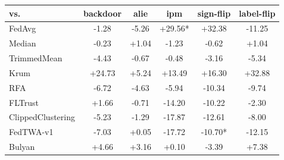 \begin{tabular}{lccccc}
\toprule
vs. & backdoor & alie & ipm & sign-flip & label-flip \\
\midrule
FedAvg & -1.28 & -5.26 & +29.56* & +32.38 & -11.25 \\
Median & -0.23 & +1.04 & -1.23 & -0.62 & +1.04 \\
TrimmedMean & -4.43 & -0.67 & -0.48 & -3.16 & -5.34 \\
Krum & +24.73 & +5.24 & +13.49 & +16.30 & +32.88 \\
RFA & -6.72 & -4.63 & -5.94 & -10.34 & -9.74 \\
FLTrust & +1.66 & -0.71 & -14.20 & -10.22 & -2.30 \\
ClippedClustering & -5.23 & -1.29 & -17.87 & -12.61 & -8.00 \\
FedTWA-v1 & -7.03 & +0.05 & -17.72 & -10.70* & -12.15 \\
Bulyan & +4.66 & +3.16 & +0.10 & -3.39 & +7.38 \\
\bottomrule
\end{tabular}